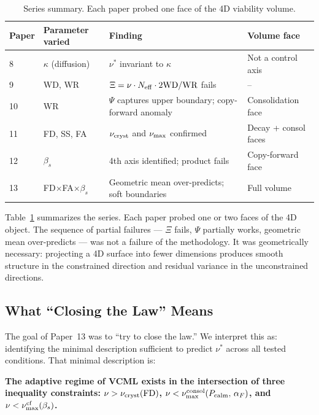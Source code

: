 \documentclass[11pt]{article}
\begin{document}
\begin{table}[h]
\centering
\caption{Series summary. Each paper probed one face of the 4D viability volume.}
\label{tab:series}
\small
\begin{tabular}{llll}
\toprule
Paper & Parameter varied & Finding & Volume face \\
\midrule
8  & $\kappa$ (diffusion) & $\nu^*$ invariant to $\kappa$ & Not a control axis \\
9  & WD, WR & $\Xi = \nu \cdot N_{\rm eff} \cdot 2\text{WD}/\text{WR}$ fails & -- \\
10 & WR & $\Psi$ captures upper boundary; copy-forward anomaly & Consolidation face \\
11 & FD, SS, FA & $\nu_{\rm cryst}$ and $\nu_{\rm max}$ confirmed & Decay + consol faces \\
12 & $\beta_s$ & 4th axis identified; product fails & Copy-forward face \\
13 & FD$\times$FA$\times\beta_s$ & Geometric mean over-predicts; soft boundaries & Full volume \\
\bottomrule
\end{tabular}
\end{table}

Table~\ref{tab:series} summarizes the series. Each paper probed one or two
faces of the 4D object. The sequence of partial failures --- $\Xi$ fails, $\Psi$
partially works, geometric mean over-predicts --- was not a failure of the
methodology. It was geometrically necessary: projecting a 4D surface into
fewer dimensions produces smooth structure in the constrained direction and
residual variance in the unconstrained directions.

\subsection{What ``Closing the Law'' Means}

The goal of Paper~13 was to ``try to close the law.'' We interpret this as:
identifying the minimal description sufficient to predict $\nu^*$ across all
tested conditions. That minimal description is:

\begin{center}
\textbf{The adaptive regime of VCML exists in the intersection of three
inequality constraints: $\nu > \nu_{\rm cryst}(\text{FD})$, $\nu <
\nu_{\rm max}^{\rm consol}(P_{\rm calm},\,\alpha_F)$, and $\nu < \nu_{\rm
max}^{\rm cf}(\beta_s)$.}
\end{center}
\end{document}
